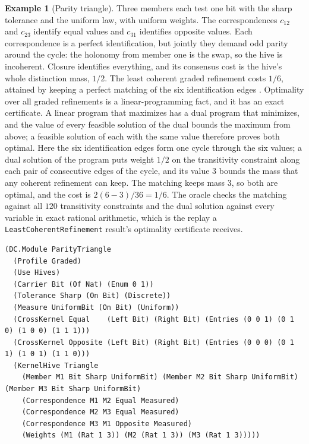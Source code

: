 \documentclass[11pt]{article}
\newcommand{\code}[1]{\texttt{#1}}
\theoremstyle{definition}
\newtheorem{example}[definition]{Example}
\theoremstyle{plain}
\begin{document}
\begin{example}[Parity triangle]\label{ex:paritytriangle}
Three members each test one bit with the sharp tolerance and the uniform law, with uniform weights.
The correspondences $c_{12}$ and $c_{23}$ identify equal values and $c_{31}$ identifies opposite
values. Each correspondence is a perfect identification, but jointly they demand odd parity around
the cycle: the holonomy from member one is the swap, so the hive is incoherent. Closure identifies
everything, and its consensus cost is the hive's whole distinction mass, $1/2$. The least coherent
graded refinement costs $1/6$, attained by keeping a perfect matching of the six identification
edges \cite[Example~9.6]{dclosure}. Optimality over all graded refinements is a linear-programming
fact, and it has an exact certificate. A linear program that maximizes has a dual program that
minimizes, and the value of every feasible solution of the dual bounds the maximum from above; a
feasible solution of each with the same value therefore proves both optimal. Here the six
identification edges form one cycle through the six values; a dual solution of the program puts weight $1/2$ on the transitivity constraint along each
pair of consecutive edges of the cycle, and its value $3$ bounds the mass that any coherent
refinement can keep. The matching keeps mass $3$, so both are optimal, and the cost is
$2(6-3)/36=1/6$. The oracle checks the matching against all $120$ transitivity constraints and the
dual solution against every variable in exact rational arithmetic, which is the replay a
\code{LeastCoherentRefinement} result's optimality certificate receives.
\begin{lstlisting}[basicstyle=\ttfamily\footnotesize,title={\scriptsize\ttfamily fixtures/parity\_triangle.metta}]
(DC.Module ParityTriangle
  (Profile Graded)
  (Use Hives)
  (Carrier Bit (Of Nat) (Enum 0 1))
  (Tolerance Sharp (On Bit) (Discrete))
  (Measure UniformBit (On Bit) (Uniform))
  (CrossKernel Equal    (Left Bit) (Right Bit) (Entries (0 0 1) (0 1 0) (1 0 0) (1 1 1)))
  (CrossKernel Opposite (Left Bit) (Right Bit) (Entries (0 0 0) (0 1 1) (1 0 1) (1 1 0)))
  (KernelHive Triangle
    (Member M1 Bit Sharp UniformBit) (Member M2 Bit Sharp UniformBit) (Member M3 Bit Sharp UniformBit)
    (Correspondence M1 M2 Equal Measured)
    (Correspondence M2 M3 Equal Measured)
    (Correspondence M3 M1 Opposite Measured)
    (Weights (M1 (Rat 1 3)) (M2 (Rat 1 3)) (M3 (Rat 1 3)))))
\end{lstlisting}
\end{example}
\end{document}
